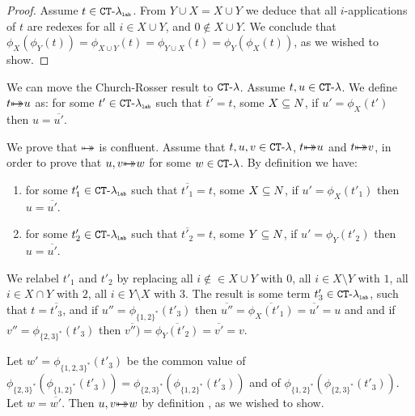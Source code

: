 \begin{proof}
Assume $t \in { { {\tt CT} \mbox{-} \lambda} _ {\mbox{\tiny \tt lab}} }$.
From $Y \cup X = X \cup Y$ we deduce that all $i$-applications of $t$ are redexes for all $i \in X \cup Y$,
and $0 \not \in X \cup Y$.
We conclude that
$\phi_{X}(\phi_{Y}(t)) = \phi_{X \cup Y}(t) = \phi_{Y \cup X}(t) = \phi_{Y}(\phi_{X}(t))$, 
as we wished to show.
\end{proof}


We can move the Church-Rosser result to ${ {\tt CT} \mbox{-} \lambda}$. Assume $t, u \in { {\tt CT} \mbox{-} \lambda}$.
We define $t {\mapsto\!\!\!\!\! \mapsto} u$ as: for some $t' \in { { {\tt CT} \mbox{-} \lambda} _ {\mbox{\tiny \tt lab}} }$
such that $\overline{t'} = t$, some $X \subseteq {N}$, if $u' = \phi_X(t')$
then $u = \overline{u'}$.


We prove that ${\mapsto\!\!\!\!\! \mapsto}$ is confluent. 
Assume that $t, u, v \in { {\tt CT} \mbox{-} \lambda}$,  $t {\mapsto\!\!\!\!\! \mapsto} u$ and
$t {\mapsto\!\!\!\!\! \mapsto} v$, in order to prove that  $u,v {\mapsto\!\!\!\!\! \mapsto} w$ for some $w \in { {\tt CT} \mbox{-} \lambda}$.
By definition we have:

\begin{enumerate}
\item
for some $t'_1 \in { { {\tt CT} \mbox{-} \lambda} _ {\mbox{\tiny \tt lab}} }$
such that $\overline{t'_1} = t$, some $X \subseteq {N}$, if $u' = \phi_X(t'_1)$
then $u = \overline{u'}$.

\item
for some $t'_2 \in { { {\tt CT} \mbox{-} \lambda} _ {\mbox{\tiny \tt lab}} }$
such that $\overline{t'_2} = t$, some $Y \subseteq {N}$, if $u' = \phi_Y(t'_2)$
then $u = \overline{u'}$.

\end{enumerate}
We relabel $t'_1$ and $t'_2$ by replacing 
all $i  \not \in \in X \cup Y$ with $0$, 
all $i \in X \setminus Y$ with $1$, 
all $i \in X \cap Y$ with $2$, 
all $i \in Y \setminus X$ with $3$. 
The result is some term $t'_3 \in { { {\tt CT} \mbox{-} \lambda} _ {\mbox{\tiny \tt lab}} }$, such that 
$t = \overline{t'_3}$, and if $u''=\phi_{\{1,2\}^*}(t'_3)$
then $\overline{u''} =  \overline{\phi_{X}(t'_1)} = \overline{u'} = u$
and and if $v''=\phi_{\{2,3\}^*}(t'_3)$
then $\overline{v'')} = 
\overline{\phi_{Y}(t'_2)} =\overline{v'} = v$.

Let $w' = \phi_{\{1,2,3\}^*}(t'_3)$ be the common value of
$\phi_{\{2,3\}^*}(\phi_{\{1,2\}^*}(t'_3)) = \phi_{\{2,3\}^*}(\phi_{\{1,2\}^*}(t'_3))$ and of $\phi_{\{1,2\}^*}(\phi_{\{2,3\}^*}(t'_3))$. 
Let $w = \overline{w'}$. Then $u,v {\mapsto\!\!\!\!\! \mapsto} w$ by definition , as we wished to show.







